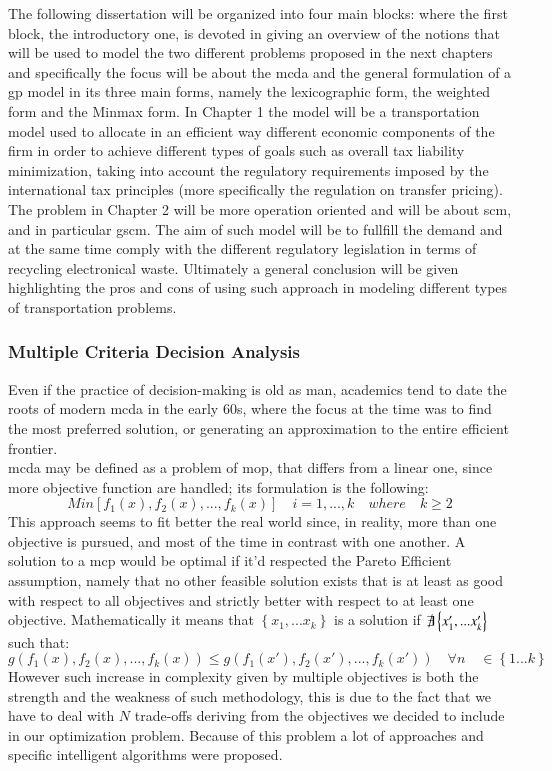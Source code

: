 \begin{doublespace}
The following dissertation will be organized into four main blocks: where the first block, the introductory one, is devoted in giving an overview of the notions that will be used to model the two different problems proposed in the next chapters and specifically the focus will be about the \gls{mcda} and the general formulation of a \gls{gp} model in its three main forms, namely the lexicographic form, the weighted form and the Minmax form. In Chapter 1 the model will be a transportation model used to allocate in an efficient way different economic components of the firm in order to achieve different types of goals such as overall tax liability minimization, taking into account the regulatory requirements imposed by the international tax principles (more specifically the regulation on transfer pricing). The problem in Chapter 2 will be more operation oriented and will be about \gls{scm}, and in particular \gls{gscm}. The aim of such model will be to fullfill the demand and at the same time comply with the different regulatory legislation in terms of recycling electronical waste. Ultimately a general conclusion will be given highlighting the pros and cons of using such approach in modeling different types of transportation problems.

\subsubsection{Multiple Criteria Decision Analysis}
Even if the practice of decision-making is old as man, academics tend to date the roots of modern \gls{mcda} in the early 60s, where the focus at the time was to find the most preferred solution, or generating an approximation to the entire efficient frontier\cite{Greco2016}.
\\
\gls{mcda} may be defined as a problem of \gls{mop}, that differs from a linear one,
since more objective function are handled; its formulation is the following:
	$$
	Min[f_1(x),f_2(x),...,f_k(x)] \quad i=1,...,k \quad where \quad k\geq2
	$$
This approach seems to fit better the real world since, in reality, more than one objective is pursued, and most of the time in contrast with one another.
A solution to a \gls{mcp} would be optimal if it'd respected the Pareto Efficient assumption, namely that no other feasible solution exists that is at least as good with respect to all objectives and strictly better with respect to at least one objective. Mathematically it means that $\left\{x_1,...x_k\right\}$ is a solution if $\not\exists \left\{x'_1,...x'_k\right\}$
such that:
	\[
	g(f_1(x),f_2(x),...,f_k(x)) \leq g(f_1(x'),f_2(x'),...,f_k(x')) \quad \forall n \quad \in  \left\{1...k\right\}
	\]
However such increase in complexity given by multiple objectives is both the strength and the weakness of such methodology, this is due to the fact that we have to deal with $N$ trade-offs deriving from the objectives we decided to include in our optimization problem. Because of this problem a lot of approaches and specific intelligent algorithms were proposed\cite{Cui2017}.


\end{doublespace}
